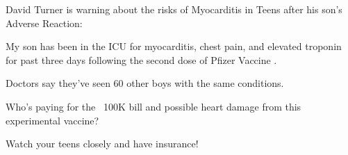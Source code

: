 David Turner is warning about the risks of Myocarditis in Teens after his son’s
Adverse Reaction:

My son has been in the ICU for myocarditis, chest pain, and elevated troponin
for past three days following the second dose of Pfizer Vaccine .

Doctors say they’ve seen 60 other boys with the same conditions.

Who’s paying for the ~100K bill and possible heart damage from this experimental
vaccine?

Watch your teens closely and have insurance!

